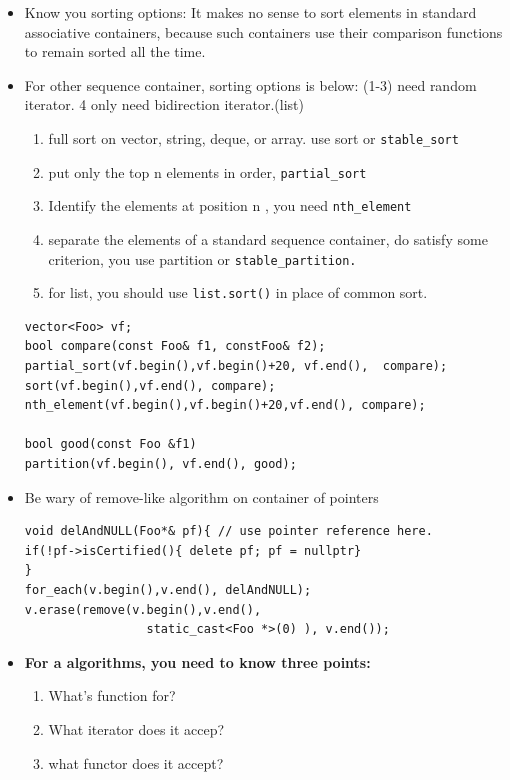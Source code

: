 \documentclass[a4paper,11pt,twoside]{book}
\begin{document}
\begin{itemize}
\item Know you sorting options: It makes no sense to sort elements in standard associative containers, because such containers use their comparison functions to remain sorted all the time.

\item For other sequence container, sorting options is below: (1-3) need random iterator. 4 only need bidirection iterator.(list)
  \begin{enumerate}
  \item full sort on vector, string, deque, or array.  use sort or \texttt{stable\_sort}
  \item put only the top n elements in order, \texttt{partial\_sort}
  \item Identify the elements at position n , you need \texttt{nth\_element}
  \item separate the elements of a standard sequence container, do satisfy some criterion, you use partition or \texttt{stable\_partition.}
  \item for list, you should use \texttt{list.sort()} in place of common sort.
  \end{enumerate}
\begin{lstlisting}[numbers=none]
vector<Foo> vf;
bool compare(const Foo& f1, constFoo& f2);
partial_sort(vf.begin(),vf.begin()+20, vf.end(),  compare);
sort(vf.begin(),vf.end(), compare);
nth_element(vf.begin(),vf.begin()+20,vf.end(), compare);

bool good(const Foo &f1)
partition(vf.begin(), vf.end(), good);
\end{lstlisting}

\item Be wary of remove-like algorithm on container of pointers
\begin{lstlisting}[numbers=none]
void delAndNULL(Foo*& pf){ // use pointer reference here.
if(!pf->isCertified(){ delete pf; pf = nullptr}
}
for_each(v.begin(),v.end(), delAndNULL);
v.erase(remove(v.begin(),v.end(),
                 static_cast<Foo *>(0) ), v.end());
\end{lstlisting}


\item \textbf{For a algorithms, you need to know three points:}
\begin{enumerate}
	\item What's function  for?
	\item What iterator does it accep? 
	\item what functor does it accept?
\end{enumerate}
	
\end{itemize}
\end{document}
